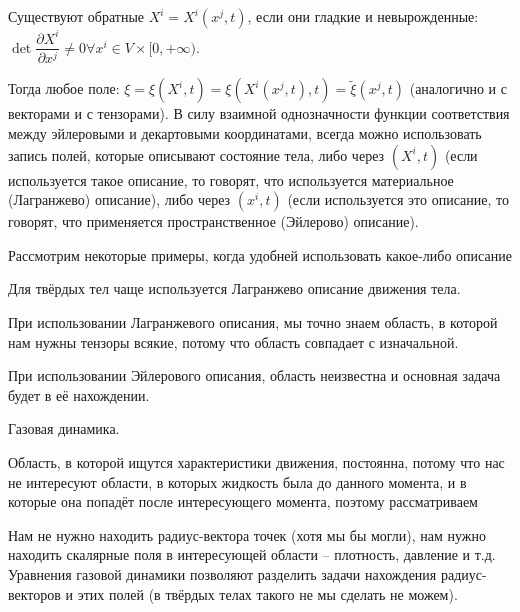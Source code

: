Существуют обратные $X^i = X^i ( x^j, t )$, если они гладкие и невырожденные: $\det \dfrac{\partial X^i}{\partial x^j} \neq 0 \forall x^i \in V \times [0, +\infty)$.

Тогда любое поле: $\xi = \xi(X^i, t) = \xi(X^i(x^j, t), t) = \tilde{\xi} (x^j, t)$ (аналогично и с
векторами и с тензорами). В силу взаимной однозначности функции соответствия между эйлеровыми и 
декартовыми координатами, всегда можно использовать запись полей, которые описывают состояние
тела, либо через $(X^i, t)$ (если используется такое описание, то говорят, что используется
материальное (Лагранжево) описание), либо через $(x^i, t)$ (если используется это описание, то 
говорят, что применяется пространственное (Эйлерово) описание).

Рассмотрим некоторые примеры, когда удобней использовать какое-либо описание

\begin{example} 
  Для твёрдых тел чаще используется Лагранжево описание движения тела.
  
  \begin{figure}[H]
  	\centering
  	
  \end{figure}
  
  При использовании Лагранжевого описания, мы точно знаем область, в которой нам нужны тензоры
  всякие, потому что область совпадает с изначальной.

  При использовании Эйлерового описания, область неизвестна и основная задача будет в её
  нахождении.
\end{example}

\begin{example}
  Газовая динамика.
  
  \begin{figure}[H]
  	\centering
  	
  \end{figure}
  
  Область, в которой ищутся характеристики движения, постоянна, потому что нас не интересуют
  области, в которых жидкость была до данного момента, и в которые она попадёт после интересующего 
  момента, поэтому рассматриваем

  Нам не нужно находить радиус-вектора точек (хотя мы бы могли), нам нужно находить скалярные поля
  в интересующей области -- плотность, давление и т.д. Уравнения газовой динамики позволяют разделить
  задачи нахождения радиус-векторов и этих полей (в твёрдых телах такого не мы сделать не можем).
\end{example}

